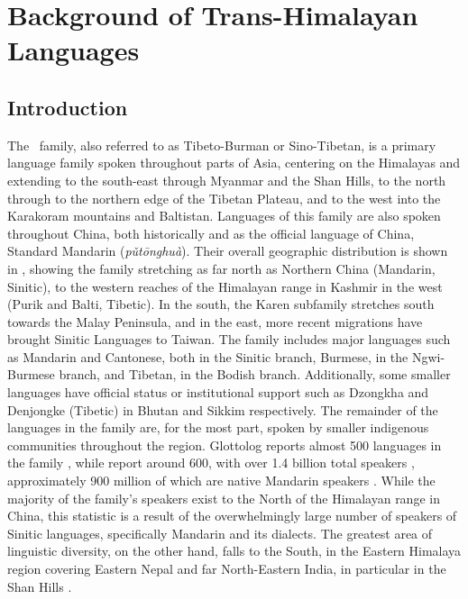 \chapter{Background of Trans-Himalayan Languages}\label{c:THOverview}

\section{Introduction}
The \lfam\ family, also referred to as Tibeto-Burman or Sino-Tibetan, is a primary language family spoken throughout parts of Asia, centering on the Himalayas and extending to the south-east through Myanmar and the Shan Hills, to the north through to the northern edge of the Tibetan Plateau, and to the west into the Karakoram mountains and Baltistan. Languages of this family are also spoken throughout China, both historically and as the official language of China, Standard Mandarin (\textit{pǔtōnghuà}). Their overall geographic distribution is shown in , showing the family stretching as far north as Northern China (Mandarin, Sinitic), to the western reaches of the Himalayan range in Kashmir in the west (Purik and Balti, Tibetic). In the south, the Karen subfamily stretches south towards the Malay Peninsula, and in the east, more recent migrations have brought Sinitic Languages to Taiwan. The family includes major languages such as Mandarin and Cantonese, both in the Sinitic branch, Burmese, in the Ngwi-Burmese branch, and Tibetan, in the Bodish branch. Additionally, some smaller languages have official status or institutional support such as Dzongkha and Denjongke (Tibetic) in Bhutan and Sikkim respectively. The remainder of the languages in the family are, for the most part, spoken by smaller indigenous communities throughout the region. Glottolog reports almost 500 languages in the family \cite{glottolog}, while  report around 600, with over 1.4 billion total speakers \cite{ZhangH2020Baye}, approximately 900 million of which are native Mandarin speakers \cite{Ethnologue}. While the majority of the family's speakers exist to the North of the Himalayan range in China, this statistic is a result of the overwhelmingly large number of speakers of Sinitic languages, specifically Mandarin and its dialects. The greatest area of linguistic diversity, on the other hand, falls to the South, in the Eastern Himalaya region covering Eastern Nepal and far North-Eastern India, in particular in the Shan Hills \cite{BlenchPost2014}.

